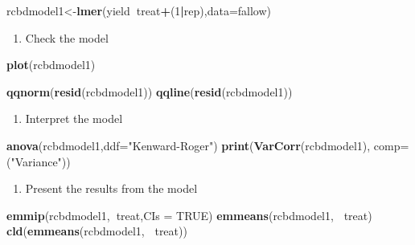 \documentclass[]{book}
\newenvironment{Shaded}{\begin{snugshade}}{\end{snugshade}}
\newcommand{\KeywordTok}[1]{\textcolor[rgb]{0.13,0.29,0.53}{\textbf{#1}}}
\newcommand{\DataTypeTok}[1]{\textcolor[rgb]{0.13,0.29,0.53}{#1}}
\newcommand{\DecValTok}[1]{\textcolor[rgb]{0.00,0.00,0.81}{#1}}
\newcommand{\StringTok}[1]{\textcolor[rgb]{0.31,0.60,0.02}{#1}}
\newcommand{\OtherTok}[1]{\textcolor[rgb]{0.56,0.35,0.01}{#1}}
\newcommand{\OperatorTok}[1]{\textcolor[rgb]{0.81,0.36,0.00}{\textbf{#1}}}
\newcommand{\NormalTok}[1]{#1}
\providecommand{\tightlist}{%
  \setlength{\itemsep}{0pt}\setlength{\parskip}{0pt}}
\theoremstyle{definition}
\theoremstyle{definition}
\theoremstyle{definition}
\theoremstyle{remark}
\begin{document}
\begin{Shaded}
\begin{Highlighting}[]
\NormalTok{rcbdmodel1<-}\KeywordTok{lmer}\NormalTok{(yield}\OperatorTok{~}\NormalTok{treat}\OperatorTok{+}\NormalTok{(}\DecValTok{1}\OperatorTok{|}\NormalTok{rep),}\DataTypeTok{data=}\NormalTok{fallow)}
\end{Highlighting}
\end{Shaded}

\begin{enumerate}
\def\labelenumi{\arabic{enumi}.}
\setcounter{enumi}{5}
\tightlist
\item
  Check the model
\end{enumerate}

\begin{Shaded}
\begin{Highlighting}[]
\KeywordTok{plot}\NormalTok{(rcbdmodel1)}

\KeywordTok{qqnorm}\NormalTok{(}\KeywordTok{resid}\NormalTok{(rcbdmodel1))}
\KeywordTok{qqline}\NormalTok{(}\KeywordTok{resid}\NormalTok{(rcbdmodel1))}
\end{Highlighting}
\end{Shaded}

\begin{enumerate}
\def\labelenumi{\arabic{enumi}.}
\setcounter{enumi}{6}
\tightlist
\item
  Interpret the model
\end{enumerate}

\begin{Shaded}
\begin{Highlighting}[]
\KeywordTok{anova}\NormalTok{(rcbdmodel1,}\DataTypeTok{ddf=}\StringTok{"Kenward-Roger"}\NormalTok{)}
\KeywordTok{print}\NormalTok{(}\KeywordTok{VarCorr}\NormalTok{(rcbdmodel1), }\DataTypeTok{comp=}\NormalTok{(}\StringTok{"Variance"}\NormalTok{))}
\end{Highlighting}
\end{Shaded}

\begin{enumerate}
\def\labelenumi{\arabic{enumi}.}
\setcounter{enumi}{7}
\tightlist
\item
  Present the results from the model
\end{enumerate}

\begin{Shaded}
\begin{Highlighting}[]
\KeywordTok{emmip}\NormalTok{(rcbdmodel1,}\OperatorTok{~}\NormalTok{treat,}\DataTypeTok{CIs =} \OtherTok{TRUE}\NormalTok{)}
\KeywordTok{emmeans}\NormalTok{(rcbdmodel1, }\OperatorTok{~}\NormalTok{treat)}
\KeywordTok{cld}\NormalTok{(}\KeywordTok{emmeans}\NormalTok{(rcbdmodel1, }\OperatorTok{~}\NormalTok{treat))}
\end{Highlighting}
\end{Shaded}
\end{document}
